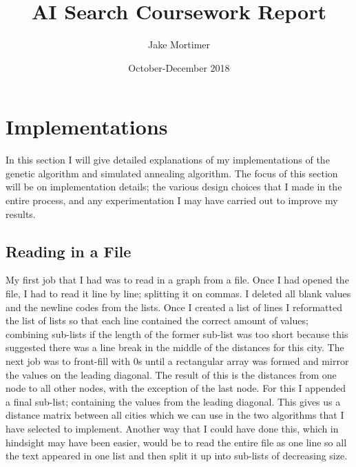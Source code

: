 \documentclass{article}
\title{AI Search Coursework Report}
\author{Jake Mortimer}
\date{October-December 2018}
\begin{document}
\maketitle
\section{Implementations}
In this section I will give detailed explanations of my implementations
of the genetic algorithm and simulated
annealing algorithm. The focus of this section will be on
implementation details; the various design choices that I made
in the entire process, and any experimentation I may have carried out to improve my results.
\subsection{Reading in a File}
My first job that I had was to read in a graph from a file. Once I had opened the file, I had to read it line by line; splitting it on commas. I deleted all blank values and the newline codes from the lists. Once I created a list of lines I reformatted the list of lists so that each line contained the correct amount of values; combining sub-lists if the length of the former sub-list was too short because this suggested there was a line break in the middle of the distances for this city. The next job was to front-fill with 0s until a rectangular array was formed and mirror the values on the leading diagonal. The result of this is the distances from one node to all other nodes, with the exception of the last node. For this I appended a final sub-list; containing the values from the leading diagonal. This gives us a distance matrix between all cities which we can use in the two algorithms that I have selected to implement.  Another way that I could have done this, which in hindsight may have been easier, would be to read the entire file as one line so all the text appeared in one list and then split it up into sub-lists of decreasing size.
\end{document}
